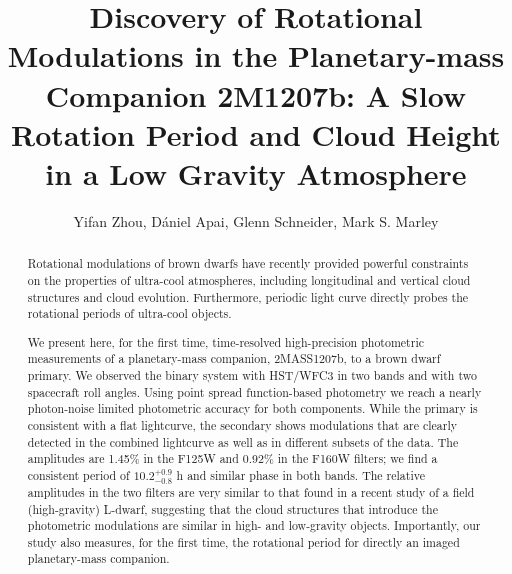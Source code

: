 \documentclass[apj]{emulateapj}
\begin{document}


\title{Discovery of Rotational Modulations in the Planetary-mass
  Companion 2M1207b: A Slow Rotation Period and Cloud Height in a Low
  Gravity Atmosphere}
\author{Yifan Zhou, D\'aniel Apai,
  Glenn Schneider,  Mark S. Marley}


\begin{abstract}
  Rotational modulations of brown dwarfs have recently provided
  powerful constraints on the properties of ultra-cool atmospheres,
  including longitudinal and vertical cloud structures and cloud
  evolution. Furthermore, periodic light curve directly probes the rotational periods of ultra-cool objects.

  We present here, for the first time, time-resolved high-precision
  photometric measurements of a planetary-mass companion, 2MASS1207b,
  to a brown dwarf primary.  We observed the binary system with
  HST/WFC3 in two bands and with two spacecraft roll angles. Using
  point spread function-based photometry we reach a nearly
  photon-noise limited photometric accuracy for both components. While
  the primary is consistent with a flat lightcurve, the secondary
  shows modulations that are clearly detected in the combined
  lightcurve as well as in different subsets of the data.  The
  amplitudes are 1.45\% in the F125W and 0.92\% in the F160W filters;
  we find a consistent period of $10.2^{+0.9}_{-0.8}$ h and similar
  phase in both bands. {\color{red}The relative amplitudes in the two filters are
    very similar to that found in a recent study of a field
    (high-gravity) L-dwarf, suggesting that the cloud structures that
    introduce the photometric modulations are similar in high- and
    low-gravity objects.} Importantly, our study also measures, for
  the first time, the rotational period for directly an imaged
  planetary-mass companion.
\end{abstract}

\maketitle
%

\end{document}
